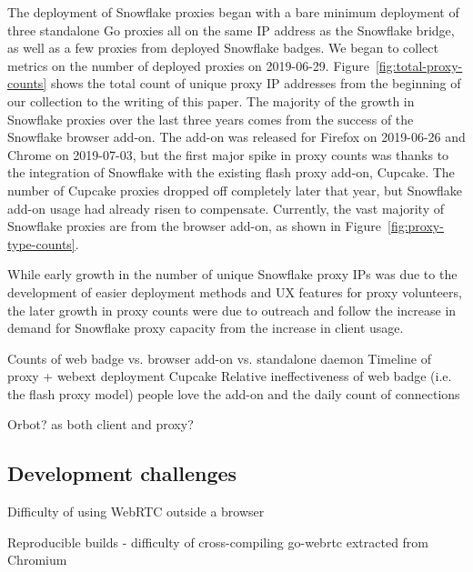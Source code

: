 \documentclass[letterpaper,twocolumn]{article}
\begin{document}
The deployment of Snowflake proxies began with a bare minimum deployment of three standalone Go proxies all on the same IP address as the Snowflake bridge, as well as a few proxies from deployed Snowflake badges. We began to collect metrics on the number of deployed proxies on \mbox{2019-06-29}. Figure~\ref{fig:total-proxy-counts} shows the total count of unique proxy IP addresses from the beginning of our collection to the writing of this paper. The majority of the growth in Snowflake proxies over the last three years comes from the success of the Snowflake browser add-on. The add-on was released for Firefox on \mbox{2019-06-26} and Chrome on \mbox{2019-07-03}, but the first major spike in proxy counts was thanks to the integration of Snowflake with the existing flash proxy add-on, Cupcake. The number of Cupcake proxies dropped off completely later that year, but Snowflake add-on usage had already risen to compensate. Currently, the vast majority of Snowflake proxies are from the browser add-on, as shown in Figure~\ref{fig:proxy-type-counts}.

While early growth in the number of unique Snowflake proxy IPs was due to the development of easier deployment methods and UX features for proxy volunteers, the later growth in proxy counts were due to outreach and follow the increase in demand for Snowflake proxy capacity from the increase in client usage. 

Counts of web badge vs. browser add-on vs. standalone daemon
Timeline of proxy + webext deployment
Cupcake
Relative ineffectiveness of web badge (i.e. the flash proxy model)
people love the add-on and the daily count of connections

Orbot? as both client and proxy?

\subsection{Development challenges}


Difficulty of using WebRTC outside a browser

Reproducible builds
- difficulty of cross-compiling go-webrtc extracted from Chromium
\end{document}
